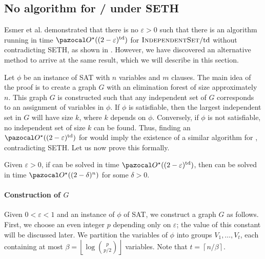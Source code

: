 \subsection{No algorithm for /\td{} under SETH}
\label{section:indset-td}

Esmer et al. \cite{esmer2024fundamental} demonstrated that there is no $\varepsilon > 0$ such that there is an algorithm running in time $\O^\star((2 - \varepsilon)^\td)$ for $\textsc{IndependentSet}/\text{td}$ without contradicting SETH, as shown in . However, we have discovered an alternative method to arrive at the same result, which we will describe in this section.

\medskip

Let $\phi$ be an instance of SAT with $n$ variables and $m$ clauses. The main idea of the proof is to create a graph $G$ with an elimination forest of size approximately $n$. This graph $G$ is constructed such that any independent set of $G$ corresponds to an assignment of variables in $\phi$. If $\phi$ is satisfiable, then the largest independent set in $G$ will have size $k$, where $k$ depends on $\phi$. Conversely, if $\phi$ is not satisfiable, no independent set of size $k$ can be found. Thus, finding an $\O^\star((2 - \varepsilon)^\td)$ for  would imply the existence of a similar algorithm for , contradicting SETH. Let us now prove this formally.

\begin{theorem}
    \label{theorem:indset-td-lowerbound}
    Given $\varepsilon > 0$, if  can be solved in time $\O^\star((2-\varepsilon)^\td)$, then  can be solved in time $\O^\star((2 - \delta)^n)$ for some $\delta > 0$.
\end{theorem}

\paragraph*{Construction of $G$} Given $0 < \varepsilon < 1$ and an instance of $\phi$ of SAT, we construct a graph $G$ as follows. First, we choose an even integer $p$ depending only on $\varepsilon$; the value of this constant will be discussed later. We partition the variables of $\phi$ into groups $V_1, \dots, V_t$, each containing at most $\beta = \left\lfloor\log\binom{p}{p/2}\right\rfloor$ variables. Note that $t = \left\lceil n/\beta\right\rceil$.

\medskip

